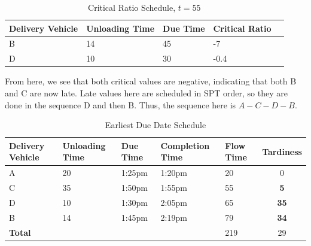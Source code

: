 \documentclass[12pt]{article}
\begin{document}
\begin{table}[H]
    \centering
    \begin{tabular}{p{1.8cm} p{3cm} p{1.8cm} p{1.8cm} p{1.8cm}} \toprule
        \textbf{Delivery Vehicle} & \textbf{Unloading Time} & \textbf{Due Time} & \textbf{Critical Ratio} \\ \midrule 
        B & 14 & 45 & -7 \\ 
        D & 10 & 30 & -0.4 \\ \bottomrule
    \end{tabular}
    \caption{Critical Ratio Schedule, $t = 55$}
    \label{tab:4-CR3}
\end{table}

\noindent From here, we see that both critical values are negative, indicating that both B and C are now late. Late values here are scheduled in SPT order, so they are done in the sequence D and then B. Thus, the sequence here is $A-C-D-B$. 

\begin{table}[H]
    \centering
    \begin{tabular}{p{1.8cm} p{3cm} p{1.8cm} p{3cm} p{1.8cm} c} \toprule
        \textbf{Delivery Vehicle} & \textbf{Unloading Time} & \textbf{Due Time} & \textbf{Completion Time} & \textbf{Flow Time} & \textbf{Tardiness} \\ \midrule 
        A & 20 & 1:25pm & 1:20pm & 20 & 0 \\ 
        C & 35 & 1:50pm & 1:55pm & 55 & \textbf{5} \\ 
        D & 10 & 1:30pm & 2:05pm & 65 & \textbf{35} \\ 
        B & 14 & 1:45pm & 2:19pm & 79 & \textbf{34} \\ \midrule
        \textbf{Total} & & & & 219 & 29 \\ \bottomrule
    \end{tabular}
    \caption{Earliest Due Date Schedule}
    \label{tab:4-CR4}
\end{table}
\end{document}
